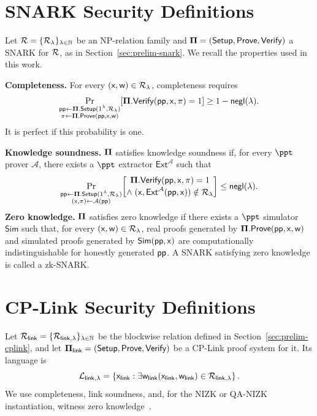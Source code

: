 \section{SNARK Security Definitions}
\label{app:snark-security}

Let \({\mathcal{R}}=\{{\mathcal{R}}_\lambda\}_{\lambda\in\mathbb{N}}\) be an NP-relation
family and \({\bf \Pi}=({\sf Setup},{\sf Prove},{\sf Verify})\) a SNARK for \({\mathcal{R}}\), as in
Section~\ref{sec:prelim-snark}.  We recall the properties used in this work.

\noindent\textbf{Completeness.}
For every \((\mathsf{x},\mathsf{w})\in{\mathcal{R}}_\lambda\), completeness requires
\[
\Pr_{\substack{
  \textsf{pp}\gets{\bf \Pi}.{\sf Setup}(1^\lambda,{\mathcal{R}}_\lambda)\\
  \pi\gets{\bf \Pi}.{\sf Prove}(\textsf{pp},\mathsf{x},\mathsf{w})}}
\!\left[{\bf \Pi}.{\sf Verify}(\textsf{pp},\mathsf{x},\pi)=1\right]
\ge 1-\textsf{negl}(\lambda).
\]
It is perfect if this probability is one.

\noindent\textbf{Knowledge soundness.}
\({\bf \Pi}\) satisfies knowledge soundness if, for every \(\ppt\) prover
\(\mathcal{A}\), there exists a \(\ppt\) extractor
\(\mathsf{Ext}^{\mathcal{A}}\) such that
\[
\Pr_{\substack{
  \textsf{pp}\gets{\bf \Pi}.{\sf Setup}(1^\lambda,{\mathcal{R}}_\lambda)\\
  (\mathsf{x},\pi)\gets\mathcal A(\textsf{pp})}}
\!\left[
\begin{gathered}
  {\bf \Pi}.{\sf Verify}(\textsf{pp},\mathsf{x},\pi)=1\\[-1mm]
  \wedge\;
  (\mathsf{x},\mathsf{Ext}^{\mathcal A}(\textsf{pp},\mathsf{x}))\notin{\mathcal{R}}_\lambda
\end{gathered}
\right]
\le\textsf{negl}(\lambda).
\]
\noindent\textbf{Zero knowledge.}
\({\bf \Pi}\) satisfies zero knowledge if there exists a \(\ppt\) simulator
\(\mathsf{Sim}\) such that, for every
\((\mathsf{x},\mathsf{w})\in{\mathcal{R}}_\lambda\), real proofs generated by
\({\bf \Pi}.{\sf Prove}(\textsf{pp},\mathsf{x},\mathsf{w})\) and simulated proofs generated by
\(\mathsf{Sim}(\textsf{pp},\mathsf{x})\) are computationally indistinguishable for
honestly generated \(\textsf{pp}\).
A SNARK satisfying zero knowledge is called a zk-SNARK.

\section{CP-Link Security Definitions}
\label{app:cplink-security}

Let
\({\mathcal{R}}_{\mathsf{link}}
=\{{\mathcal{R}}_{\mathsf{link},\lambda}\}_{\lambda\in\mathbb{N}}\)
be the blockwise relation defined in Section~\ref{sec:prelim-cplink}, and let
\({\bf \Pi}_{\mathsf{link}}=({\sf Setup},{\sf Prove},{\sf Verify})\) be a CP-Link proof system for
it.  Its language is
\[
  \mathcal{L}_{\mathsf{link},\lambda}
  =
  \left\{
    \mathsf{x}_{\mathsf{link}}
    :
    \exists \mathsf{w}_{\mathsf{link}}
    (\mathsf{x}_{\mathsf{link}},\mathsf{w}_{\mathsf{link}})
    \in
    {\mathcal{R}}_{\mathsf{link},\lambda}
  \right\}.
\]
We use completeness, link soundness, and, for the NIZK or QA-NIZK
instantiation, witness zero knowledge~\cite{legosnark,qa-nizk}.

